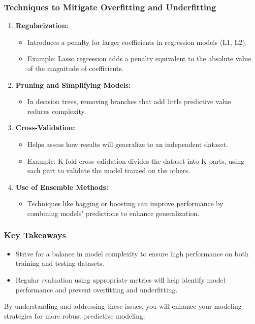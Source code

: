 \documentclass[aspectratio=169]{beamer}
\begin{document}
\begin{frame}[fragile]
    \frametitle{Techniques to Mitigate Overfitting and Underfitting}
    \begin{enumerate}
        \item \textbf{Regularization:}
            \begin{itemize}
                \item Introduces a penalty for larger coefficients in regression models (L1, L2).
                \item Example: Lasso regression adds a penalty equivalent to the absolute value of the magnitude of coefficients.
            \end{itemize}
        \item \textbf{Pruning and Simplifying Models:}
            \begin{itemize}
                \item In decision trees, removing branches that add little predictive value reduces complexity.
            \end{itemize}
        \item \textbf{Cross-Validation:}
            \begin{itemize}
                \item Helps assess how results will generalize to an independent dataset.
                \item Example: K-fold cross-validation divides the dataset into K parts, using each part to validate the model trained on the others.
            \end{itemize}
        \item \textbf{Use of Ensemble Methods:}
            \begin{itemize}
                \item Techniques like bagging or boosting can improve performance by combining models' predictions to enhance generalization.
            \end{itemize}
    \end{enumerate}
\end{frame}

\begin{frame}[fragile]
    \frametitle{Key Takeaways}
    \begin{itemize}
        \item Strive for a balance in model complexity to ensure high performance on both training and testing datasets.
        \item Regular evaluation using appropriate metrics will help identify model performance and prevent overfitting and underfitting.
    \end{itemize}
    
    By understanding and addressing these issues, you will enhance your modeling strategies for more robust predictive modeling.
\end{frame}
\end{document}

